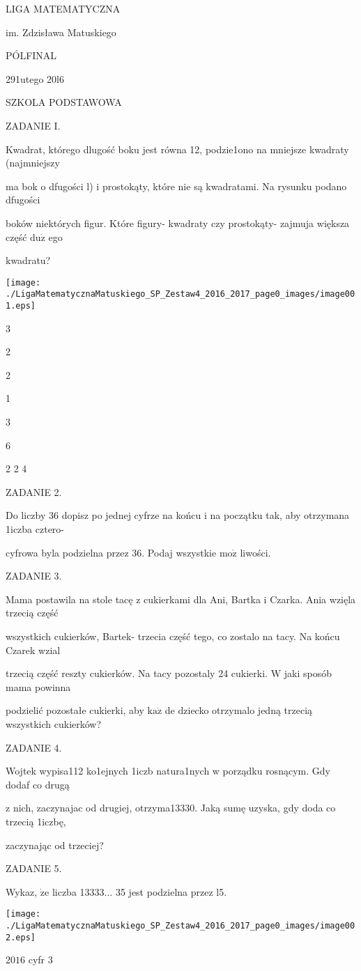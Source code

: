\documentclass[a4paper,12pt]{article}
\begin{document}
LIGA MATEMATYCZNA

im. Zdzisława Matuskiego

PÓLFINAL

291utego 20l6

SZKOLA PODSTAWOWA

ZADANIE I.

Kwadrat, którego dlugość boku jest równa 12, podzie1ono na mniejsze kwadraty (najmniejszy

ma bok o dfugości l) i prostokąty, które nie są kwadratami. Na rysunku podano dfugości

boków niektórych figur. Które figury- kwadraty czy prostokąty- zajmuja większa część $\mathrm{d}\mathrm{u}\dot{\mathrm{z}}$ ego

kwadratu?
\begin{center}
\texttt{[image: ./LigaMatematycznaMatuskiego\_SP\_Zestaw4\_2016\_2017\_page0\_images/image001.eps]}
\end{center}
3

2

2

1

3

6

2 2 4

ZADANIE 2.

Do liczby 36 dopisz po jednej cyfrze na końcu i na początku tak, aby otrzymana 1iczba cztero-

cyfrowa byla podzielna przez 36. Podaj wszystkie $\mathrm{m}\mathrm{o}\dot{\mathrm{z}}$ liwości.

ZADANIE 3.

Mama postawila na stole tacę z cukierkami dla Ani, Bartka i Czarka. Ania wzięla trzecią część

wszystkich cukierków, Bartek- trzecia część tego, co zostalo na tacy. Na końcu Czarek wzial

trzecią część reszty cukierków. Na tacy pozostaly 24 cukierki. $\mathrm{W}$ jaki sposób mama powinna

podzielić pozostałe cukierki, aby $\mathrm{k}\mathrm{a}\dot{\mathrm{z}}$ de dziecko otrzymalo jedną trzecią wszystkich cukierków?

ZADANIE 4.

Wojtek wypisa112 ko1ejnych 1iczb natura1nych w porządku rosnącym. Gdy dodaf co drugą

z nich, zaczynajac od drugiej, otrzyma13330. Jaką sumę uzyska, gdy doda co trzecią 1iczbę,

zaczynając od trzeciej?

ZADANIE 5.

Wykaz, $\dot{\mathrm{z}}\mathrm{e}$ liczba 13333$\ldots$ 35 jest podzielna przez l5.
\begin{center}
\texttt{[image: ./LigaMatematycznaMatuskiego\_SP\_Zestaw4\_2016\_2017\_page0\_images/image002.eps]}
\end{center}
$2016$ cyfr 3
\end{document}
